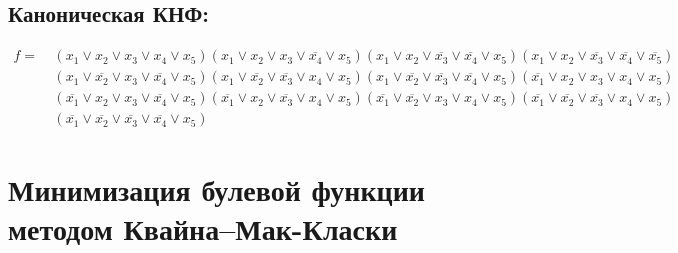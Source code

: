 \documentclass{article}
\begin{document}
\subsection*{Каноническая КНФ:}
\begin{align*}
f =\: &\left(x_{1} \lor x_{2} \lor x_{3} \lor x_{4} \lor x_{5}\right)\left(x_{1} \lor x_{2} \lor x_{3} \lor \overline{x_{4}} \lor x_{5}\right)\left(x_{1} \lor x_{2} \lor \overline{x_{3}} \lor \overline{x_{4}} \lor x_{5}\right)\left(x_{1} \lor x_{2} \lor \overline{x_{3}} \lor \overline{x_{4}} \lor \overline{x_{5}}\right)\\&\left(x_{1} \lor \overline{x_{2}} \lor x_{3} \lor \overline{x_{4}} \lor x_{5}\right)\left(x_{1} \lor \overline{x_{2}} \lor \overline{x_{3}} \lor x_{4} \lor x_{5}\right)\left(x_{1} \lor \overline{x_{2}} \lor \overline{x_{3}} \lor \overline{x_{4}} \lor x_{5}\right)\left(\overline{x_{1}} \lor x_{2} \lor x_{3} \lor x_{4} \lor x_{5}\right)\\&\left(\overline{x_{1}} \lor x_{2} \lor x_{3} \lor \overline{x_{4}} \lor x_{5}\right)\left(\overline{x_{1}} \lor x_{2} \lor \overline{x_{3}} \lor x_{4} \lor x_{5}\right)\left(\overline{x_{1}} \lor \overline{x_{2}} \lor x_{3} \lor x_{4} \lor x_{5}\right)\left(\overline{x_{1}} \lor \overline{x_{2}} \lor \overline{x_{3}} \lor x_{4} \lor x_{5}\right)\\&\left(\overline{x_{1}} \lor \overline{x_{2}} \lor \overline{x_{3}} \lor \overline{x_{4}} \lor x_{5}\right)\end{align*}
\section*{Минимизация булевой функции методом Квайна--Мак-Класки}
\end{document}
